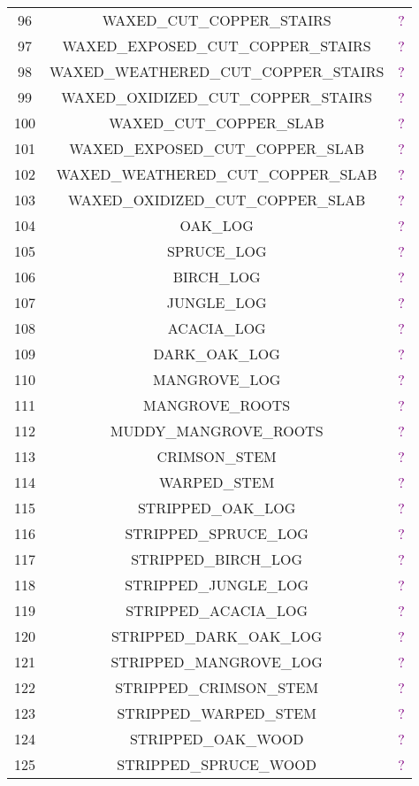 \documentclass[11pt]{article}
\newcommand\myworries[1]{\textcolor{purple}{#1}}
\begin{document}
\begin{longtable}{ |c|c|c| }
	96 & WAXED\_CUT\_COPPER\_STAIRS & \myworries{?} \\
	97 & WAXED\_EXPOSED\_CUT\_COPPER\_STAIRS & \myworries{?} \\
	98 & WAXED\_WEATHERED\_CUT\_COPPER\_STAIRS & \myworries{?} \\
	99 & WAXED\_OXIDIZED\_CUT\_COPPER\_STAIRS & \myworries{?} \\
	100 & WAXED\_CUT\_COPPER\_SLAB & \myworries{?} \\
	101 & WAXED\_EXPOSED\_CUT\_COPPER\_SLAB & \myworries{?} \\
	102 & WAXED\_WEATHERED\_CUT\_COPPER\_SLAB & \myworries{?} \\
	103 & WAXED\_OXIDIZED\_CUT\_COPPER\_SLAB & \myworries{?} \\
	104 & OAK\_LOG & \myworries{?} \\
	105 & SPRUCE\_LOG & \myworries{?} \\
	106 & BIRCH\_LOG & \myworries{?} \\
	107 & JUNGLE\_LOG & \myworries{?} \\
	108 & ACACIA\_LOG & \myworries{?} \\
	109 & DARK\_OAK\_LOG & \myworries{?} \\
	110 & MANGROVE\_LOG & \myworries{?} \\
	111 & MANGROVE\_ROOTS & \myworries{?} \\
	112 & MUDDY\_MANGROVE\_ROOTS & \myworries{?} \\
	113 & CRIMSON\_STEM & \myworries{?} \\
	114 & WARPED\_STEM & \myworries{?} \\
	115 & STRIPPED\_OAK\_LOG & \myworries{?} \\
	116 & STRIPPED\_SPRUCE\_LOG & \myworries{?} \\
	117 & STRIPPED\_BIRCH\_LOG & \myworries{?} \\
	118 & STRIPPED\_JUNGLE\_LOG & \myworries{?} \\
	119 & STRIPPED\_ACACIA\_LOG & \myworries{?} \\
	120 & STRIPPED\_DARK\_OAK\_LOG & \myworries{?} \\
	121 & STRIPPED\_MANGROVE\_LOG & \myworries{?} \\
	122 & STRIPPED\_CRIMSON\_STEM & \myworries{?} \\
	123 & STRIPPED\_WARPED\_STEM & \myworries{?} \\
	124 & STRIPPED\_OAK\_WOOD & \myworries{?} \\
	125 & STRIPPED\_SPRUCE\_WOOD & \myworries{?} \\

\end{longtable}
\end{document}
